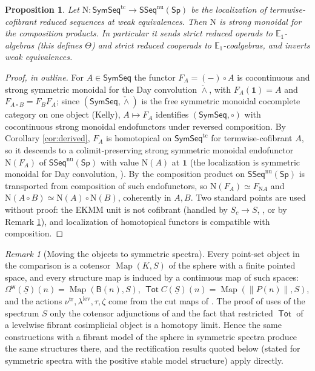 \documentclass[11pt]{amsart}
\newtheorem{proposition}[subsection]{Proposition}
\theoremstyle{definition}
\theoremstyle{remark}
\newtheorem{remark}[subsection]{Remark}
\newcommand{\Sp}{\mathsf{Sp}}
\newcommand{\Tot}{\operatorname{\mathsf{Tot}}}
\newcommand{\Map}{\operatorname{Map}}
\newcommand{\SymSeq}{\mathsf{SymSeq}}
\newcommand{\SSeq}{\mathsf{SSeq}}
\newcommand{\uS}{\underline{S}}
\newcommand{\BC}{\mathsf{B}}
\newcommand{\Omw}{\Omega^{\mathsf{w}}}
\newcommand{\unit}{\mathbf{1}}
\newcommand{\Lev}{\mathrm{lev}}
\newcommand{\tr}{\mathrm{tr}}
\newcommand{\Nfun}{\mathrm{N}}
\newcommand{\Th}{\Theta}
\begin{document}
\begin{proposition}\label{prop:N}
Let $\Nfun\colon\SymSeq^{\mathrm{tc}}\to\SSeq^{\mathrm{nu}}(\Sp)$ be the localization of termwise-cofibrant reduced sequences at weak equivalences. Then $\Nfun$ is strong monoidal for the composition products. In particular it sends strict reduced operads to $\mathbb{E}_1$-algebras (this defines $\Th$) and strict reduced cooperads to $\mathbb{E}_1$-coalgebras, and inverts weak equivalences.
\end{proposition}
\begin{proof}[Proof, in outline]
For $A\in\SymSeq$ the functor $F_A=(-)\circ A$ is cocontinuous and strong symmetric monoidal for the Day convolution $\check\wedge$, with $F_A(\unit)=A$ and $F_{A\circ B}=F_B F_A$; since $(\SymSeq,\check\wedge)$ is the free symmetric monoidal cocomplete category on one object (Kelly), $A\mapsto F_A$ identifies $(\SymSeq,\circ)$ with cocontinuous strong monoidal endofunctors under reversed composition. By Corollary \ref{cor:derived}, $F_A$ is homotopical on $\SymSeq^{\mathrm{tc}}$ for termwise-cofibrant $A$, so it descends to a colimit-preserving strong symmetric monoidal endofunctor $\Nfun(F_A)$ of $\SSeq^{\mathrm{nu}}(\Sp)$ with value $\Nfun(A)$ at $\unit$ (the localization is symmetric monoidal for Day convolution, \cite[4.1.7.4, 2.2.6]{HA}). By \cite[Remark 2.7]{BH} the composition product on $\SSeq^{\mathrm{nu}}(\Sp)$ is transported from composition of such endofunctors, so $\Nfun(F_A)\simeq F_{\Nfun A}$ and $\Nfun(A\circ B)\simeq\Nfun(A)\circ\Nfun(B)$, coherently in $A,B$. Two standard points are used without proof: the EKMM unit is not cofibrant (handled by $S_c\to S$, \cite[VII.4]{EKMM}, or by Remark \ref{rem:transport}), and localization of homotopical functors is compatible with composition.
\end{proof}

\begin{remark}[Moving the objects to symmetric spectra]\label{rem:transport}
Every point-set object in the comparison is a cotensor $\Map(K,S)$ of the sphere with a finite pointed space, and every structure map is induced by a continuous map of such spaces: $\Omw(\uS)(n)=\Map(\BC(n),S)$, $\Tot C(\uS)(n)=\Map(\|P(n)\|,S)$, and the actions $\nu^{\tr},\lambda^{\Lev},\tau,\zeta$ come from the cut maps of \cite[Definition A.31, Constructions A.67--A.69, Theorem A.60]{Cl2}. The proof of \cite[Theorem 1.3]{Cl2} uses of the spectrum $S$ only the cotensor adjunctions of \cite[\S A.3]{Cl2} and the fact that restricted $\Tot$ of a levelwise fibrant cosimplicial object is a homotopy limit. Hence the same constructions with a fibrant model of the sphere in symmetric spectra produce the same structures there, and the rectification results quoted below (stated for symmetric spectra with the positive stable model structure) apply directly.
\end{remark}
\end{document}
